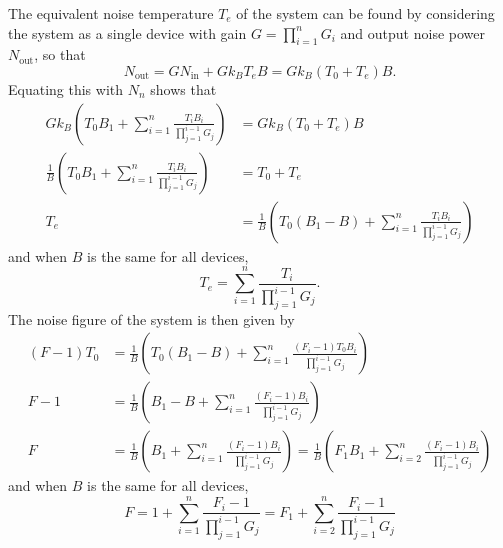 \documentclass{article}
\begin{document}
The equivalent noise temperature \(T_e\) of the system can be found by considering
the system as a single device with gain \(G = \prod_{i=1}^n G_i\) and
output noise power \(N_\mathrm{out}\), so that
\begin{equation*}
    N_\mathrm{out} = G N_\mathrm{in} + G k_B T_e B = G k_B \left( T_0 + T_e \right) B.
\end{equation*}
Equating this with \(N_n\) shows that
\begin{align*}
    G k_B \left( T_0 B_1 + \sum_{i=1}^n \frac{T_i B_i}{\prod_{j=1}^{i-1} G_j} \right)       & = G k_B \left( T_0 + T_e \right) B                                                                           \\
    \frac{1}{B} \left( T_0 B_1 + \sum_{i=1}^n \frac{T_i B_i}{\prod_{j=1}^{i-1} G_j} \right) & = T_0 + T_e                                                                                                  \\
    T_e                                                                                     & = \frac{1}{B} \left( T_0 \left( B_1 - B \right) + \sum_{i=1}^n \frac{T_i B_i}{\prod_{j=1}^{i-1} G_j} \right)
\end{align*}
and when \(B\) is the same for all devices,
\begin{equation*}
    T_e = \sum_{i=1}^n \frac{T_i}{\prod_{j=1}^{i-1} G_j}.
\end{equation*}
The noise figure of the system is then given by
\begin{align*}
    \left( F - 1 \right) T_0 & = \frac{1}{B} \left( T_0 \left( B_1 - B \right) + \sum_{i=1}^n \frac{\left( F_i - 1 \right) T_0 B_i}{\prod_{j=1}^{i-1} G_j} \right)                                                                                   \\
    F - 1                    & = \frac{1}{B} \left( B_1 - B + \sum_{i=1}^n \frac{\left( F_i - 1 \right) B_i}{\prod_{j=1}^{i-1} G_j} \right)                                                                                                          \\
    F                        & = \frac{1}{B} \left( B_1 + \sum_{i=1}^n \frac{\left( F_i - 1 \right) B_i}{\prod_{j=1}^{i-1} G_j} \right) = \frac{1}{B} \left( F_1 B_1 + \sum_{i=2}^n \frac{\left( F_i - 1 \right) B_i}{\prod_{j=1}^{i-1} G_j} \right)
\end{align*}
and when \(B\) is the same for all devices,
\begin{equation*}
    F = 1 + \sum_{i=1}^n \frac{F_i - 1}{\prod_{j=1}^{i-1} G_j} = F_1 + \sum_{i=2}^n \frac{F_i - 1}{\prod_{j=1}^{i-1} G_j}
\end{equation*}
\end{document}
